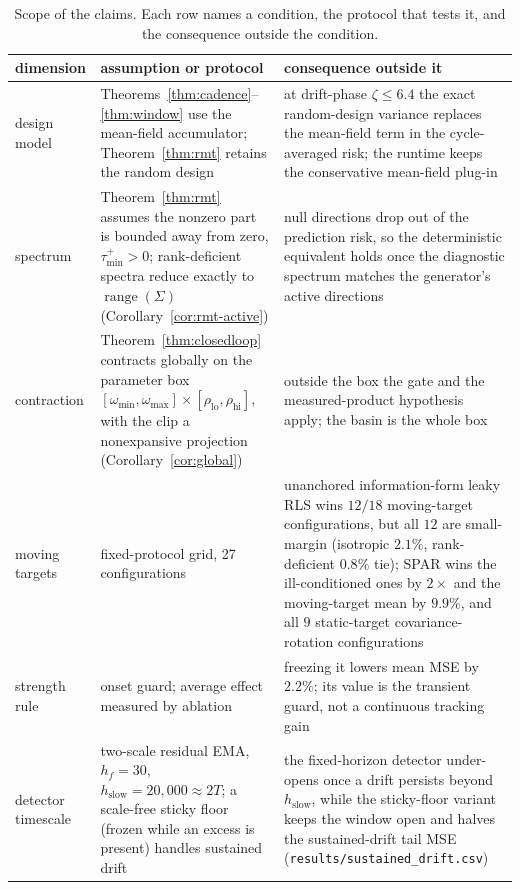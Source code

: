 \documentclass[10pt]{article}
\begin{document}
\begin{table}[t]
\centering
\footnotesize
\setlength{\tabcolsep}{4pt}
\renewcommand{\arraystretch}{0.95}
\caption{Scope of the claims. Each row names a condition, the protocol that tests it, and the consequence outside the condition.}
\label{tab:scope}
\begin{tabular}{p{1.15in}p{2.1in}p{2.55in}}
\toprule
dimension & assumption or protocol & consequence outside it \\
\midrule
design model & Theorems~\ref{thm:cadence}--\ref{thm:window} use the mean-field accumulator; Theorem~\ref{thm:rmt} retains the random design & at drift-phase $\zeta \le 6.4$ the exact random-design variance replaces the mean-field term in the cycle-averaged risk; the runtime keeps the conservative mean-field plug-in \\
spectrum & Theorem~\ref{thm:rmt} assumes the nonzero part is bounded away from zero, $\tau_{\min}^+>0$; rank-deficient spectra reduce exactly to $\operatorname{range}(\Sigma)$ (Corollary~\ref{cor:rmt-active}) & null directions drop out of the prediction risk, so the deterministic equivalent holds once the diagnostic spectrum matches the generator's active directions \\
contraction & Theorem~\ref{thm:closedloop} contracts globally on the parameter box $[\omega_{\min},\omega_{\max}]\times[\rho_{\mathrm{lo}},\rho_{\mathrm{hi}}]$, with the clip a nonexpansive projection (Corollary~\ref{cor:global}) & outside the box the gate and the measured-product hypothesis apply; the basin is the whole box \\
moving targets & fixed-protocol grid, 27 configurations & unanchored information-form leaky RLS wins $12/18$ moving-target configurations, but all $12$ are small-margin (isotropic $2.1\%$, rank-deficient $0.8\%$ tie); SPAR wins the ill-conditioned ones by $2\times$ and the moving-target mean by $9.9\%$, and all $9$ static-target covariance-rotation configurations \\
strength rule & onset guard; average effect measured by ablation & freezing it lowers mean MSE by $2.2\%$; its value is the transient guard, not a continuous tracking gain \\
detector timescale & two-scale residual EMA, $h_f = 30$, $h_{\mathrm{slow}} = 20{,}000 \approx 2T$; a scale-free sticky floor (frozen while an excess is present) handles sustained drift & the fixed-horizon detector under-opens once a drift persists beyond $h_{\mathrm{slow}}$, while the sticky-floor variant keeps the window open and halves the sustained-drift tail MSE (\texttt{results/sustained\_drift.csv}) \\

\end{tabular}
\end{table}
\end{document}
